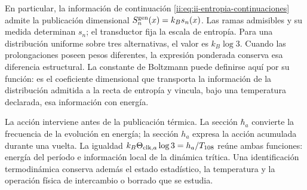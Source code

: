 En particular, la información de continuación
\eqref{ii:eq:ii-entropia-continuaciones} admite la publicación dimensional
\(S_n^{\rm gen}(x)=k_Bs_n(x)\). Las ramas admisibles y su medida
determinan \(s_n\); el transductor fija la escala de entropía. Para
una distribución uniforme sobre tres alternativas, el valor es
\(k_B\log3\). Cuando las prolongaciones poseen pesos diferentes,
la expresión ponderada conserva esa diferencia estructural. La
constante de Boltzmann puede definirse aquí por su función: es el
coeficiente dimensional que transporta la información de la
distribución admitida a la recta de entropía y vincula, bajo una
temperatura declarada, esa información con energía.

La acción interviene antes de la publicación térmica. La sección
\(\hbar_a\) convierte la frecuencia de la evolución en energía;
la sección \(h_a\) expresa la acción acumulada durante una vuelta.
La igualdad \(k_B\Theta_{{\rm clk},a}\log3=h_a/T_{108}\)
reúne ambas funciones: energía del período e información local de
la dinámica trítica. Una identificación termodinámica conserva
además el estado estadístico, la temperatura y la operación física
de intercambio o borrado que se estudia.
